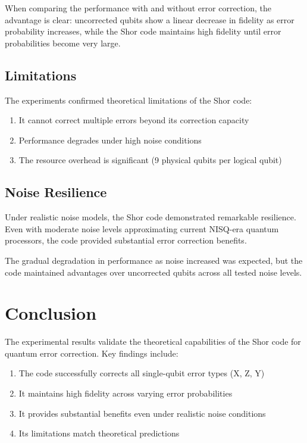 \documentclass[12pt,a4paper]{article}
\begin{document}
When comparing the performance with and without error correction, the advantage is clear: uncorrected qubits show a linear decrease in fidelity as error probability increases, while the Shor code maintains high fidelity until error probabilities become very large.

\subsection{Limitations}

The experiments confirmed theoretical limitations of the Shor code:
\begin{enumerate}
    \item It cannot correct multiple errors beyond its correction capacity
    \item Performance degrades under high noise conditions
    \item The resource overhead is significant (9 physical qubits per logical qubit)
\end{enumerate}

\subsection{Noise Resilience}

Under realistic noise models, the Shor code demonstrated remarkable resilience. Even with moderate noise levels approximating current NISQ-era quantum processors, the code provided substantial error correction benefits.

The gradual degradation in performance as noise increased was expected, but the code maintained advantages over uncorrected qubits across all tested noise levels.



\section{Conclusion}

The experimental results validate the theoretical capabilities of the Shor code for quantum error correction. Key findings include:

\begin{enumerate}
    \item The code successfully corrects all single-qubit error types (X, Z, Y)
    \item It maintains high fidelity across varying error probabilities
    \item It provides substantial benefits even under realistic noise conditions
    \item Its limitations match theoretical predictions
\end{enumerate}
\end{document}
